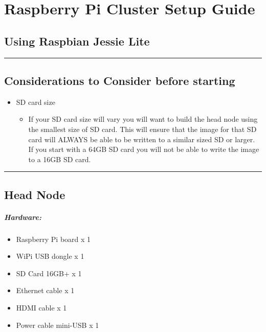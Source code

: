 \documentclass[]{article}
\date{}
\providecommand{\tightlist}{%
  \setlength{\itemsep}{0pt}\setlength{\parskip}{0pt}}
\let\oldsubparagraph\subparagraph
\renewcommand{\subparagraph}[1]{\oldsubparagraph{#1}\mbox{}}
\begin{document}
\section{Raspberry Pi Cluster Setup
Guide}\label{raspberry-pi-cluster-setup-guide}

\subsection{Using Raspbian Jessie
Lite}\label{using-raspbian-jessie-lite}

\begin{center}\rule{0.5\linewidth}{\linethickness}\end{center}

\subsection{Considerations to Consider before
starting}\label{considerations-to-consider-before-starting}

\begin{itemize}
\tightlist
\item
  SD card size

  \begin{itemize}
  \tightlist
  \item
    If your SD card size will vary you will want to build the head node
    using the smallest size of SD card. This will ensure that the image
    for that SD card will ALWAYS be able to be written to a similar
    sized SD or larger. If you start with a 64GB SD card you will not be
    able to write the image to a 16GB SD card.
  \end{itemize}
\end{itemize}

\begin{center}\rule{0.5\linewidth}{\linethickness}\end{center}

\subsection{Head Node}\label{head-node}

\subparagraph{Hardware:}\label{hardware}

\begin{itemize}
\tightlist
\item
  Raspberry Pi board x 1
\item
  WiPi USB dongle x 1
\item
  SD Card 16GB+ x 1
\item
  Ethernet cable x 1
\item
  HDMI cable x 1
\item
  Power cable mini-USB x 1
\end{itemize}
\end{document}
